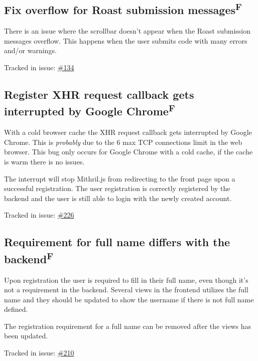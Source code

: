 \documentclass[12pt,a4paper]{report}
\begin{document}
\subsection{Fix overflow for Roast submission messages\texorpdfstring{\textsuperscript{F}}{}}
There is an issue where the scrollbar doesn't appear when the Roast submission messages overflow. This happens when the user submits code with many errors and/or warnings.

Tracked in issue: \href{https://github.com/LuleaUniversityOfTechnology/2018-project-roaster/issues/134}{\#134}

\subsection{Register XHR request callback gets interrupted by Google  Chrome\texorpdfstring{\textsuperscript{F}}{}}
With a cold browser cache the XHR request callback gets interrupted by Google Chrome. This is \textit{probably} due to the 6 max TCP connections limit in the web browser. This bug only occurs for Google Chrome with a cold cache, if the cache is warm there is no issues.

The interrupt will stop Mithril.js from redirecting to the front page upon a successful registration. The user registration is correctly registered by the backend and the user is still able to login with the newly created account.

Tracked in issue: \href{https://github.com/LuleaUniversityOfTechnology/2018-project-roaster/issues/226}{\#226}

\subsection{Requirement for full name differs with the backend\texorpdfstring{\textsuperscript{F}}{}}
Upon registration the user is required to fill in their full name, even though it's not a requirement in the backend. Several views in the frontend utilizes the full name and they should be updated to show the username if there is not full name defined.

The registration requirement for a full name can be removed after the views has been updated.

Tracked in issue: \href{https://github.com/LuleaUniversityOfTechnology/2018-project-roaster/issues/210}{\#210}
\end{document}
